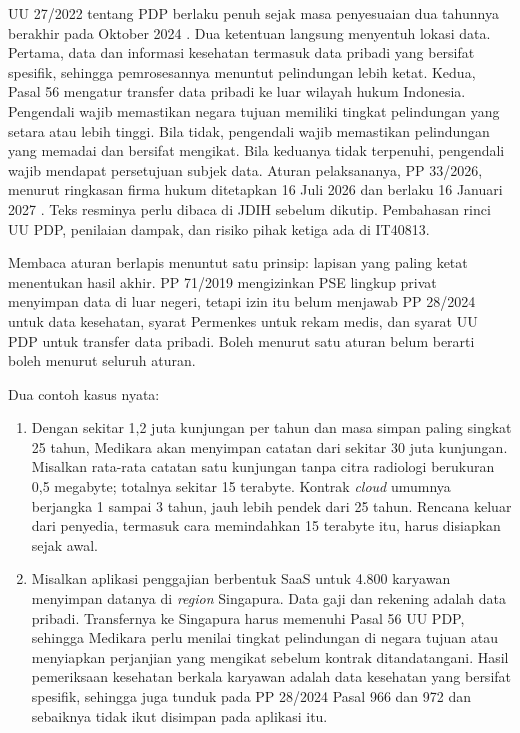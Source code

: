 UU 27/2022 tentang PDP berlaku penuh sejak masa penyesuaian dua tahunnya berakhir pada
Oktober 2024 \cite{uu27-2022-pdp}. Dua ketentuan langsung menyentuh lokasi data. Pertama,
data dan informasi kesehatan termasuk data pribadi yang bersifat spesifik, sehingga
pemrosesannya menuntut pelindungan lebih ketat. Kedua, Pasal 56 mengatur transfer data
pribadi ke luar wilayah hukum Indonesia. Pengendali wajib memastikan negara tujuan memiliki
tingkat pelindungan yang setara atau lebih tinggi. Bila tidak, pengendali wajib memastikan
pelindungan yang memadai dan bersifat mengikat. Bila keduanya tidak terpenuhi, pengendali
wajib mendapat persetujuan subjek data. Aturan pelaksananya, PP 33/2026, menurut ringkasan
firma hukum ditetapkan 16 Juli 2026 dan berlaku 16 Januari 2027 \cite{pp33-2026}. Teks
resminya perlu dibaca di JDIH sebelum dikutip. Pembahasan rinci UU PDP, penilaian dampak,
dan risiko pihak ketiga ada di IT40813.

Membaca aturan berlapis menuntut satu prinsip: lapisan yang paling ketat menentukan hasil
akhir. PP 71/2019 mengizinkan PSE lingkup privat menyimpan data di luar negeri, tetapi izin
itu belum menjawab PP 28/2024 untuk data kesehatan, syarat Permenkes untuk rekam medis, dan syarat
UU PDP untuk transfer data pribadi. Boleh menurut satu aturan belum berarti boleh menurut seluruh aturan.

Dua contoh kasus nyata:
\begin{enumerate}
  \item Dengan sekitar 1,2 juta kunjungan per tahun dan masa simpan paling singkat 25 tahun,
        Medikara akan menyimpan catatan dari sekitar 30 juta kunjungan. Misalkan rata-rata
        catatan satu kunjungan tanpa citra radiologi berukuran 0,5 megabyte; totalnya
        sekitar 15 terabyte. Kontrak \textit{cloud} umumnya berjangka 1 sampai 3 tahun, jauh
        lebih pendek dari 25 tahun. Rencana keluar dari penyedia, termasuk cara memindahkan
        15 terabyte itu, harus disiapkan sejak awal.
  \item Misalkan aplikasi penggajian berbentuk SaaS untuk 4.800 karyawan menyimpan datanya
        di \textit{region} Singapura. Data gaji dan rekening adalah data pribadi. Transfernya ke
        Singapura harus memenuhi Pasal 56 UU PDP, sehingga Medikara perlu menilai tingkat
        pelindungan di negara tujuan atau menyiapkan perjanjian yang mengikat sebelum kontrak
        ditandatangani. Hasil pemeriksaan kesehatan berkala karyawan adalah data kesehatan yang
        bersifat spesifik, sehingga juga tunduk pada PP 28/2024 Pasal 966 dan 972 dan sebaiknya
        tidak ikut disimpan pada aplikasi itu.
\end{enumerate}

